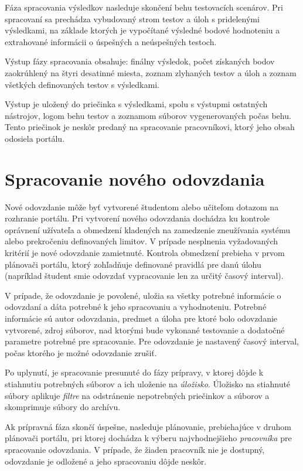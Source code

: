 \documentclass[
  digital, %
  twoside, %
  table,   %
  lof,     %
  lot,     %
]{fithesis3}
\begin{document}
Fáza spracovania výsledkov nasleduje skončení behu testovacích scenárov. Pri spracovaní sa prechádza vybudovaný strom testov a úloh s pridelenými výsledkami, na základe ktorých je vypočítané výsledné bodové hodnoteniu a extrahované informácii o úspešných a neúspešných testoch.

Výstup fázy spracovania obsahuje: finálny výsledok, počet získaných bodov zaokrúhlený na štyri desatinné miesta, zoznam zlyhaných testov a úloh a zoznam všetkých definovaných testov s výsledkami.

Výstup je uložený do priečinka s výsledkami, spolu s výstupmi ostatných nástrojov, logom behu testov a zoznamom súborov vygenerovaných počas behu. Tento priečinok je neskôr predaný na spracovanie pracovníkovi, ktorý jeho obsah odosiela portálu.

\section{Spracovanie nového odovzdania}

Nové odovzdanie môže byť vytvorené študentom alebo učiteľom dotazom na rozhranie portálu. Pri vytvorení nového odovzdania dochádza ku kontrole oprávnení užívateľa a obmedzení kladených na zamedzenie zneužívania systému alebo prekročeniu definovaných limitov. V prípade nesplnenia vyžadovaných kritérií je nové odovzdanie zamietnuté. Kontrola obmedzení prebieha v prvom plánovači portálu, ktorý zohľadňuje definované pravidlá pre danú úlohu (napríklad študent smie odovzdať vypracovanie len za určitý časový interval).

V prípade, že odovzdanie je povolené, uložia sa všetky potrebné informácie o odovzdaní a dáta potrebné k jeho spracovaniu a vyhodnoteniu. Potrebné informácie sú autor odovzdania, predmet a úloha pre ktoré bolo odovzdanie vytvorené, zdroj súborov, nad ktorými bude vykonané testovanie a dodatočné parametre potrebné pre spracovanie. Pre odovzdanie je nastavený časový interval, počas ktorého je možné odovzdanie zrušiť.

Po uplynutí, je spracovanie presunuté do fázy prípravy, v ktorej dôjde k stiahnutiu potrebných súborov a ich uloženie na \emph{úložisko}. Úložisko na stiahnuté súbory aplikuje \emph{filtre} na odstránenie nepotrebných priečinkov a súborov a skomprimuje súbory do archívu.

Ak prípravná fáza skončí úspešne, nasleduje plánovanie, prebiehajúce v druhom plánovači portálu, pri ktorej dochádza k výberu najvhodnejšieho \emph{pracovníka} pre spracovanie odovzdania. V prípade, že žiaden pracovník nie je dostupný, odovzdanie je odložené a jeho spracovaniu dôjde neskôr.
\end{document}
